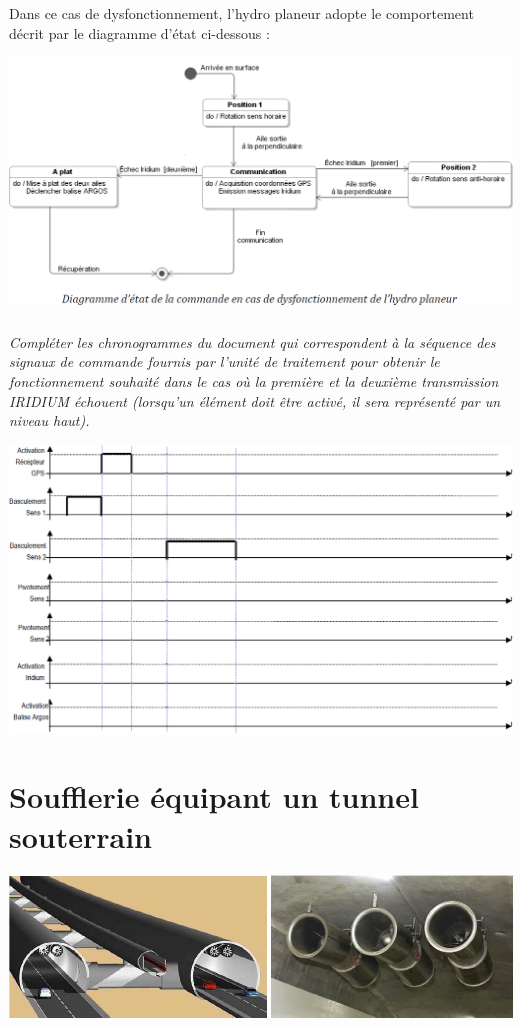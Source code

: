 \documentclass[10pt]{article}
\begin{document}
Dans ce cas de dysfonctionnement, l'hydro planeur adopte le comportement décrit par le
diagramme d'état ci-dessous :

\begin{center}
\includegraphics[width=.5\textwidth]{images/fig_06}
\end{center}

\subparagraph{}
\textit{Compléter les chronogrammes du document qui correspondent à la séquence des
signaux de commande fournis par l’unité de traitement pour obtenir le fonctionnement
souhaité dans le cas où la première et la deuxième transmission IRIDIUM échouent
(lorsqu’un élément doit être activé, il sera représenté par un niveau haut).}



\begin{center}
\includegraphics[width=.75\textwidth]{images/fig_07}
\end{center}

\section*{Soufflerie équipant un tunnel souterrain}

\begin{center}
\includegraphics[width=.95\textwidth]{images/fig_08}
\end{center}
\end{document}
